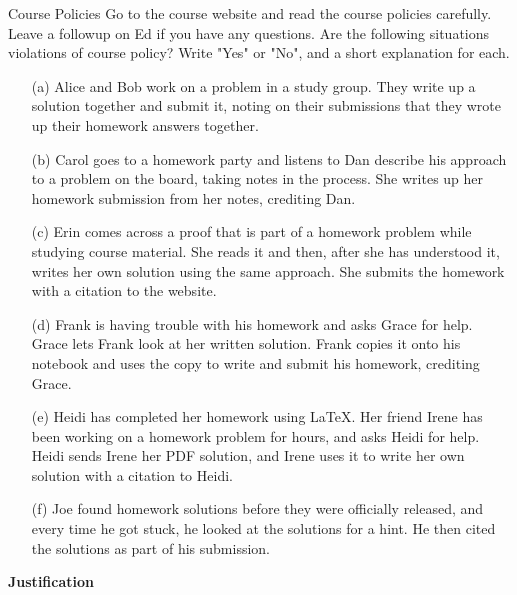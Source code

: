 \begin{homeworkProblem}{Course Policies}
    Go to the course website and read the course policies carefully. Leave 
    a followup on Ed if you have any questions. Are the following 
    situations violations of course policy? Write "Yes" or "No", and a 
    short explanation for each.

    \begin{itemize}
        \item[(a)] Alice and Bob work on a problem in a study group. They 
        write up a solution together and submit it, noting on their 
        submissions that they wrote up their homework answers together.
        \item[(b)] Carol goes to a homework party and listens to Dan 
        describe his approach to a problem on the board, taking notes in 
        the process. She writes up her homework submission from her notes, 
        crediting Dan.
        \item[(c)] Erin comes across a proof that is part of a homework 
        problem while studying course material. She reads it and then, 
        after she has understood it, writes her own solution using the same 
        approach. She submits the homework with a citation to the website. 
        \item[(d)] Frank is having trouble with his homework and asks Grace 
        for help. Grace lets Frank look at her written solution. Frank 
        copies it onto his notebook and uses the copy to write and submit 
        his homework, crediting Grace. 
        \item[(e)] Heidi has completed her homework using \LaTeX. Her 
        friend Irene has been working on a homework problem for hours, and 
        asks Heidi for help. Heidi sends Irene her PDF solution, and Irene 
        uses it to write her own solution with a citation to Heidi.
        \item[(f)] Joe found homework solutions before they were officially 
        released, and every time he got stuck, he looked at the solutions 
        for a hint. He then cited the solutions as part of his submission.
    \end{itemize}

    \textbf{Justification}


\end{homeworkProblem}
